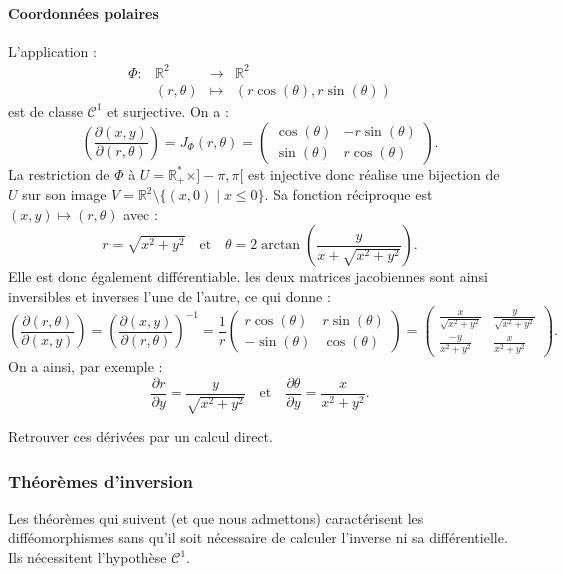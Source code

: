 \documentclass[french]{article}
\newcommand{\R}{\mathbb{R}}
\newcommand{\st}{^*}
\newcommand{\inv}{^{-1}}
\theoremstyle{plain}
\theoremstyle{definition}
\theoremstyle{remark}
\begin{document}
\paragraph{Coordonnées polaires}
L'application :
$$\begin{array}{lrcl}
	\Phi:&\R^2&\longrightarrow&\R^2\\
	&(r,\theta)&\longmapsto&(r\cos(\theta),r\sin(\theta))
\end{array}$$ est de classe $\mathcal{C}^1$ et surjective. On a :
$$\left(\frac{\partial(x,y)}{\partial(r,\theta)}\right)=J_\Phi(r,\theta)=\begin{pmatrix}
	\cos(\theta)&-r\sin(\theta)\\
	\sin(\theta)&r\cos(\theta)
\end{pmatrix}.$$
La restriction de $\Phi$ à $U=\R_+\st\times]-\pi,\pi[$ est injective donc réalise une bijection de $U$ sur son image $V=\R^2\setminus\{(x,0)\mid x\leqslant 0\}$. Sa fonction réciproque est $(x,y)\mapsto(r,\theta)$ avec :
$$r=\sqrt{x^2+y^2}\quad\text{et}\quad\theta=2\arctan\left(\frac{y}{x+\sqrt{x^2+y^2}}\right).$$
Elle est donc également différentiable. les deux matrices jacobiennes sont ainsi inversibles et inverses l'une de l'autre, ce qui donne :
$$\left(\frac{\partial(r,\theta)}{\partial (x,y)}\right)=\left(\frac{\partial(x,y)}{\partial (r,\theta)}\right)\inv=\frac{1}{r}\begin{pmatrix}
	r\cos(\theta)&r\sin(\theta)\\
	-\sin(\theta)&\cos(\theta)
\end{pmatrix}=\begin{pmatrix}
\frac{x}{\sqrt{x^2+y^2}}&\frac{y}{\sqrt{x^2+y^2}}\\
\frac{-y}{x^2+y^2}&\frac{x}{x^2+y^2}
\end{pmatrix}.$$
On a ainsi, par exemple :
$$\frac{\partial r}{\partial y}=\frac{y}{\sqrt{x^2+y^2}}\quad\text{et}\quad\frac{\partial\theta}{\partial y}=\frac{x}{x^2+y^2}.$$

\begin{exo}
	Retrouver ces dérivées par un calcul direct.
\end{exo}

\subsubsection*{Théorèmes d'inversion}

Les théorèmes qui suivent (et que nous admettons) caractérisent les difféomorphismes sans qu'il soit nécessaire de calculer l'inverse ni sa différentielle. Ils nécessitent l'hypothèse $\mathcal{C}^1$.
\end{document}
